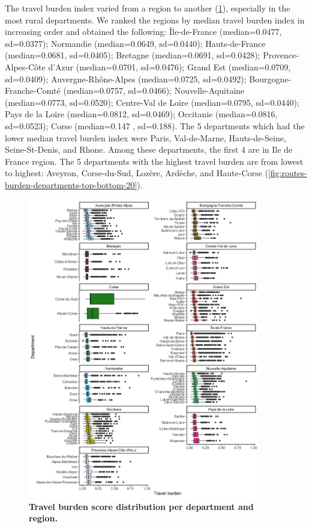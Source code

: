 The travel burden index varied from a region to another
(\cref{fig:routes-burden-departments}), especially in the most rural
departments. We ranked the regions by median travel burden index in increasing
order and obtained the following: Île-de-France (median=0.0477, sd=0.0377);
Normandie (median=0.0649, sd=0.0440); Hauts-de-France (median=0.0681,
sd=0.0405); Bretagne (median=0.0691, sd=0.0428); Provence-Alpes-Côte d'Azur
(median=0.0701, sd=0.0476); Grand Est (median=0.0709, sd=0.0409);
Auvergne-Rhône-Alpes (median=0.0725, sd=0.0492); Bourgogne-Franche-Comté
(median=0.0757, sd=0.0466); Nouvelle-Aquitaine (median=0.0773, sd=0.0520);
Centre-Val de Loire (median=0.0795, sd=0.0440); Pays de la Loire (median=0.0812,
sd=0.0469); Occitanie (median=0.0816, sd=0.0523); Corse (median=0.147 ,
sd=0.188). The 5 departments which had the lower median travel burden index were
Paris, Val-de-Marne, Hauts-de-Seine, Seine-St-Denis, and Rhone. Among these
departments, the first 4 are in Ile de France region. The 5 departments with the
highest travel burden are from lowest to highest: Aveyron, Corse-du-Sud, Lozère,
Ardèche, and Haute-Corse (\cref{fig:routes-burden-departments-top-bottom-20}).

\begin{figure}[h!]
    \includegraphics[width=0.9\textwidth]{images/routes/sup_fig_1.png}
    \centering
    \caption{
        \textbf{Travel burden score distribution per department and region.}}
    \label{fig:routes-burden-departments}
\end{figure}

